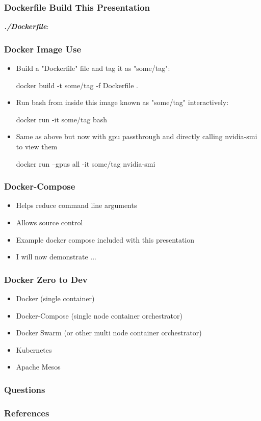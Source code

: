 \documentclass{beamer}
\begin{document}
  \begin{frame}
    \frametitle{Dockerfile Build This Presentation}
    \textbf{\textit{./Dockerfile}}:
  \end{frame}

  \begin{frame}[fragile]%
    \frametitle{Docker Image Use}
    \begin{itemize}
        \item Build a "Dockerfile" file and  tag it as "some/tag":
        \begin{bashcode}
docker build -t some/tag -f Dockerfile .
        \end{bashcode}
        \item Run bash from inside this image known as "some/tag" interactively:
        \begin{bashcode}
docker run -it some/tag bash
        \end{bashcode}
        \item Same as above but now with gpu passthrough and directly calling nvidia-smi to view them
        \begin{bashcode}
docker run --gpus all -it some/tag nvidia-smi
        \end{bashcode}
    \end{itemize}
  \end{frame}

  \begin{frame}
    \frametitle{Docker-Compose}
    \begin{itemize}
        \item Helps reduce command line arguments
        \item Allows source control
        \item Example docker compose included with this presentation
        \item I will now demonstrate ...
    \end{itemize}
  \end{frame}

  \begin{frame}
    \frametitle{Docker Zero to Dev}
    \begin{itemize}
      \item Docker (single container)
      \item Docker-Compose (single node container orchestrator)
      \item Docker Swarm (or other multi node container orchestrator)
    \end{itemize}
    \begin{itemize}
      \item Kubernetes
      \item Apache Mesos
    \end{itemize}
  \end{frame}

  \begin{frame}
      \frametitle{Questions}
  \end{frame}

  \begin{frame}[allowframebreaks]
    \frametitle{References}
    \printbibliography
  \end{frame}
\end{document}
